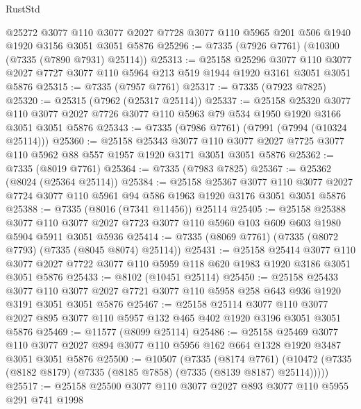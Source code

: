 \begin{lexlean}{RustStd}
\begin{coremodule}
    @25272
    @3077
    @110
    @3077
    @2027
    @7728
    @3077
    @110
    @5965
    @201
    @506
    @1940
    @1920
    @3156
    @3051
    @3051
    @5876
@25296 := @7335 (@7926 @7761) (@10300 (@7335 (@7890 @7931) @25114))
@25313 := @25158
    @25296
    @3077
    @110
    @3077
    @2027
    @7727
    @3077
    @110
    @5964
    @213
    @519
    @1944
    @1920
    @3161
    @3051
    @3051
    @5876
@25315 := @7335 (@7957 @7761)
@25317 := @7335 (@7923 @7825)
@25320 := @25315 (@7962 (@25317 @25114))
@25337 := @25158
    @25320
    @3077
    @110
    @3077
    @2027
    @7726
    @3077
    @110
    @5963
    @79
    @534
    @1950
    @1920
    @3166
    @3051
    @3051
    @5876
@25343 := @7335 (@7986 @7761) (@7991 (@7994 (@10324 @25114)))
@25360 := @25158
    @25343
    @3077
    @110
    @3077
    @2027
    @7725
    @3077
    @110
    @5962
    @88
    @557
    @1957
    @1920
    @3171
    @3051
    @3051
    @5876
@25362 := @7335 (@8019 @7761)
@25364 := @7335 (@7983 @7825)
@25367 := @25362 (@8024 (@25364 @25114))
@25384 := @25158
    @25367
    @3077
    @110
    @3077
    @2027
    @7724
    @3077
    @110
    @5961
    @94
    @586
    @1963
    @1920
    @3176
    @3051
    @3051
    @5876
@25388 := @7335 (@8016 (@7341 @11456)) @25114
@25405 := @25158
    @25388
    @3077
    @110
    @3077
    @2027
    @7723
    @3077
    @110
    @5960
    @103
    @609
    @603
    @1980
    @5904
    @5911
    @3051
    @5936
@25414 := @7335 (@8069 @7761) (@7335 (@8072 @7793) (@7335 (@8045 @8074) @25114))
@25431 := @25158
    @25414
    @3077
    @110
    @3077
    @2027
    @7722
    @3077
    @110
    @5959
    @118
    @620
    @1983
    @1920
    @3186
    @3051
    @3051
    @5876
@25433 := @8102 (@10451 @25114)
@25450 := @25158
    @25433
    @3077
    @110
    @3077
    @2027
    @7721
    @3077
    @110
    @5958
    @258
    @643
    @936
    @1920
    @3191
    @3051
    @3051
    @5876
@25467 := @25158
    @25114
    @3077
    @110
    @3077
    @2027
    @895
    @3077
    @110
    @5957
    @132
    @465
    @402
    @1920
    @3196
    @3051
    @3051
    @5876
@25469 := @11577 (@8099 @25114)
@25486 := @25158
    @25469
    @3077
    @110
    @3077
    @2027
    @894
    @3077
    @110
    @5956
    @162
    @664
    @1328
    @1920
    @3487
    @3051
    @3051
    @5876
@25500 := @10507
    (@7335
      (@8174 @7761)
      (@10472 (@7335 (@8182 @8179) (@7335 (@8185 @7858) (@7335 (@8139 @8187) @25114)))))
@25517 := @25158
    @25500
    @3077
    @110
    @3077
    @2027
    @893
    @3077
    @110
    @5955
    @291
    @741
    @1998

\end{coremodule}
\end{lexlean}
